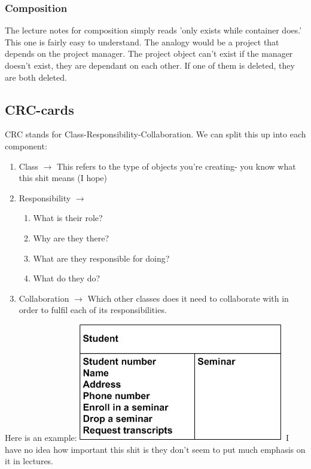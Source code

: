 \documentclass{article}
\begin{document}
\subsubsection{Composition}

The lecture notes for composition simply reads 'only exists while container does.' This one is 
fairly easy to understand. The analogy would be a project that depends on the project manager.
The project object can't exist if the manager doesn't exist, they are dependant on each other.
If one of them is deleted, they are both deleted.

\subsection{CRC-cards}

CRC stands for Class-Responsibility-Collaboration. We can split this up into each component:

\begin{enumerate}
\item Class $\longrightarrow$  This refers to the type of objects you're creating- you know what 
      this shit means (I hope)
\item Responsibility $\longrightarrow$ 
      \begin{enumerate}
      \item What is their role?
      \item Why are they there? 
      \item What are they responsible for doing?
      \item What do they do?
      \end{enumerate}
\item Collaboration $\longrightarrow$ Which other classes does it need to collaborate with in
      order to fulfil each of its responsibilities. 
\end{enumerate}

Here is an example:
\newline
\newline
\includegraphics{crc.png}
I have no idea how important this shit is they don't seem to put much emphasis on it in lectures.
\end{document}
